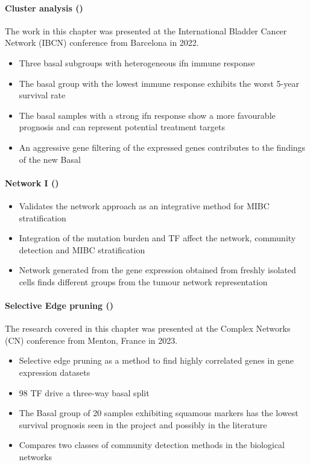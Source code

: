 \paragraph*{Cluster analysis ()}

The work in this chapter was presented at the International Bladder Cancer Network (IBCN) conference from Barcelona in 2022.


\begin{itemize}
    \item Three basal subgroups with heterogeneous \acrfull{ifn} immune response
    \item The basal group with the lowest immune response exhibits the worst 5-year survival rate
    \item The basal samples with a strong \acrshort{ifn} response show a more favourable prognosis and can represent potential treatment targets
    \item An aggressive gene filtering of the expressed genes contributes to the findings of the new Basal 
\end{itemize}

\paragraph*{Network I ()}

\begin{itemize}
    \item Validates the network approach as an integrative method for MIBC stratification
     \item Integration of the mutation burden and TF affect the network, community detection and MIBC stratification
     \item Network generated from the gene expression obtained from freshly isolated cells finds different groups from the tumour network representation
\end{itemize}

\paragraph*{Selective Edge pruning ()}

The research covered in this chapter was presented at the Complex Networks (CN) conference from Menton, France in 2023.

\begin{itemize}
    \item Selective edge pruning as a method to find highly correlated genes in gene expression datasets 
    \item 98 TF drive a three-way basal split
    \item The Basal group of 20 samples exhibiting squamous markers has the lowest survival prognosis seen in the project and possibly in the literature
    \item Compares two classes of community detection methods in the biological networks
\end{itemize}

